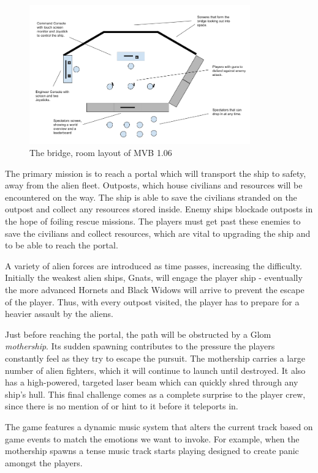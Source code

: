 \documentclass[a4paper,11pt]{article}
\begin{document}
\begin{figure}[ht]
	\centering
    \includegraphics[width=0.85\textwidth]{Room}
    \caption{The bridge, room layout of MVB 1.06}
    \label{fig:room_layout}
\end{figure}

The primary mission is to reach a portal which will transport the ship to safety, away from the alien fleet. Outposts, which house civilians and resources will be encountered on the way. The ship is able to save the civilians stranded on the outpost and collect any resources stored inside. Enemy ships blockade outposts in the hope of foiling rescue missions. The players must get past these enemies to save the civilians and collect resources, which are vital to upgrading the ship and to be able to reach the portal.

A variety of alien forces are introduced as time passes, increasing the difficulty. Initially the weakest alien ships, Gnats, will engage the player ship - eventually the more advanced Hornets and Black Widows will arrive to prevent the escape of the player. Thus, with every outpost visited, the player has to prepare for a heavier assault by the aliens.

Just before reaching the portal, the path will be obstructed by a Glom \emph{mothership}. Its sudden spawning contributes to the pressure the players constantly feel as they try to escape the pursuit. The mothership carries a large number of alien fighters, which it will continue to launch until destroyed. It also has a high-powered, targeted laser beam which can quickly shred through any ship's hull. This final challenge comes as a complete surprise to the player crew, since there is no mention of or hint to it before it teleports in.

The game features a dynamic music system that alters the current track based on game events to match the emotions we want to invoke. For example, when the mothership spawns a tense music track starts playing designed to create panic amongst the players.
\end{document}
